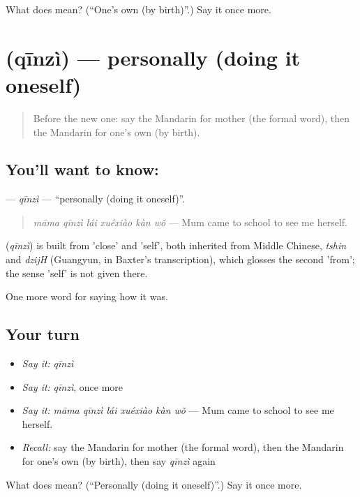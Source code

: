 \begin{tcolorbox}[breakable,colback=teal!4,colframe=teal!35!black,title={Before you move on}]
What does  mean? (\textquotedblleft{}One's own (by birth)\textquotedblright{}.) Say it once more.
\end{tcolorbox}
\section[\texorpdfstring{\zh{亲自} (qīnzì)}{亲自 (qīnzì)}]{ (qīnzì) — personally (doing it oneself)}

\label{lesson:ZH-C511-qinzi}



\begin{quote}
Before the new one: say the Mandarin for mother (the formal word), then the Mandarin for one's own (by birth).
\end{quote}

\subsection*{You'll want to know: }
\textbf{} — \emph{qīnzì} — \textquotedblleft{}personally (doing it oneself)\textquotedblright{}.

\begin{quote}
\textbf{} \emph{māma qīnzì lái xuéxiào kàn wǒ} — Mum came to school to see me herself.
\end{quote}

\begin{cousinweb}
\textbf{} (\emph{qīnzì}) is built from  'close' and  'self', both inherited from Middle Chinese, \emph{tshin} and \emph{dzijH} (Guangyun, in Baxter's transcription), which glosses the second 'from'; the sense 'self' is not given there.
\end{cousinweb}

\begin{grammarlens}[title={What you've built}]
One more word for saying how it was.
\end{grammarlens}

\subsection*{Your turn}
\begin{itemize}
\raggedright
  \item \emph{Say it:} \emph{qīnzì}
  \item \emph{Say it:} \emph{qīnzì}, once more
  \item \emph{Say it:} \emph{māma qīnzì lái xuéxiào kàn wǒ} — Mum came to school to see me herself.
  \item \emph{Recall:} say the Mandarin for mother (the formal word), then the Mandarin for one's own (by birth), then say \emph{qīnzì} again
\end{itemize}

\begin{tcolorbox}[breakable,colback=teal!4,colframe=teal!35!black,title={Before you move on}]
What does  mean? (\textquotedblleft{}Personally (doing it oneself)\textquotedblright{}.) Say it once more.
\end{tcolorbox}
